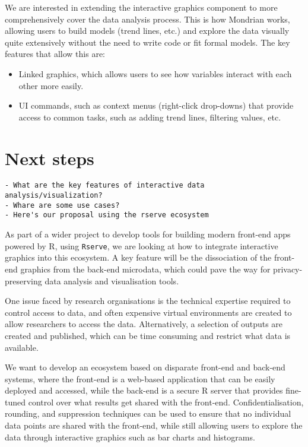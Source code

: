 \documentclass{article}
\newcommand{\pkg}[1]{\texttt{#1}}
\newcommand{\prog}[1]{{\sf #1}}
\newcommand{\proglang}[1]{\prog{#1}}
\newcommand{\R}{\prog{R}}
\begin{document}
We are interested in extending the interactive graphics component to more comprehensively cover the data analysis process.
This is how \proglang{Mondrian} works, allowing users to build models (trend lines, etc.) and explore the data visually quite extensively without the need to write code or fit formal models.
The key features that allow this are:
\begin{itemize}
\item Linked graphics, which allows users to see how variables interact with each other more easily.
\item UI commands, such as context menus (right-click drop-downs) that provide access to common tasks, such as adding trend lines, filtering values, etc.
\end{itemize}




\section{Next steps}
\label{sec:requirements}

\begin{verbatim}
- What are the key features of interactive data analysis/visualization?
- Whare are some use cases?
- Here's our proposal using the rserve ecosystem
\end{verbatim}

As part of a wider project to develop tools for building modern front-end apps powered by \R{}, using \pkg{Rserve}, we are looking at how to integrate interactive graphics into this ecosystem.
A key feature will be the dissociation of the front-end graphics from the back-end microdata, which could pave the way for privacy-preserving data analysis and visualisation tools.

One issue faced by research organisations is the technical expertise required to control access to data, and often expensive virtual environments are created to allow researchers to access the data.
Alternatively, a selection of outputs are created and published, which can be time consuming and restrict what data is available.

We want to develop an ecosystem based on disparate front-end and back-end systems, where the front-end is a web-based application that can be easily deployed and accessed, while the back-end is a secure \R{} server that provides fine-tuned control over what results get shared with the front-end.
Confidentialisation, rounding, and suppression techniques can be used to ensure that no individual data points are shared with the front-end, while still allowing users to explore the data through interactive graphics such as bar charts and histograms.
\end{document}
